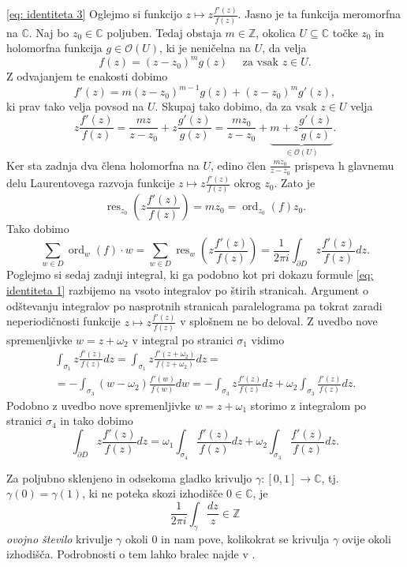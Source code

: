 \documentclass[mat1]{fmfdelo}
\numberwithin{equation}{section}
\newcommand{\Z}{\mathbb Z}
\newcommand{\C}{\mathbb C}
\newcommand{\res}[2]{\operatorname{res}_{#1}(#2)}
\newcommand{\ord}[2]{\operatorname{ord}_{#1}(#2)}
\newcommand{\hol}[1]{\mathcal{O}(#1)}
\theoremstyle{definition}
\begin{document}
\begin{dokaz}
    \eqref{eq: identiteta 3} Oglejmo si funkcijo $z \mapsto z \frac{f'(z)}{f(z)}$. Jasno je ta funkcija meromorfna na $\C$. Naj bo $z_0 \in \C$ poljuben. Tedaj obstaja $m \in \Z$, okolica $U \subseteq \C$ točke $z_0$ in holomorfna funkcija $g \in \hol{U}$, ki je neničelna na $U$, da velja
    \[
        f(z) = (z - z_0)^m g(z) \quad \text{ za vsak $z \in U$.}  
    \]
    Z odvajanjem te enakosti dobimo
    \[
        f'(z) = m(z - z_0)^{m - 1} g(z) + (z - z_0)^m g'(z),
    \]
    ki prav tako velja povsod na $U$. Skupaj tako dobimo, da za vsak $z \in U$ velja
    \[
        z\frac{f'(z)}{f(z)} = \frac{mz}{z-z_0} + z\frac{g'(z)}{g(z)} = \frac{mz_0}{z-z_0} + \underbrace{m + z\frac{g'(z)}{g(z)}}_{\in \hol{U}}.
    \]
    Ker sta zadnja dva člena holomorfna na $U$, edino člen $\frac{mz_0}{z-z_0}$ prispeva h glavnemu delu Laurentovega razvoja funkcije $z \mapsto z \frac{f'(z)}{f(z)}$ okrog $z_0$. Zato je 
    \[
        \operatorname{res}_{z_0} \left( z \frac{f'(z)}{f(z)} \right) = mz_0 = \ord{z_0}{f}z_0.  
    \]
    Tako dobimo 
    \[
        \sum_{w \in D} \ord{w}{f}\cdot w 
        = \sum_{w \in D} \operatorname{res}_{w} \left( z \frac{f'(z)}{f(z)} \right)
        = \frac{1}{2 \pi i} \int_{\partial D} z \frac{f'(z)}{f(z)}dz. 
    \] 
    Poglejmo si sedaj zadnji integral, ki ga podobno kot pri dokazu formule \eqref{eq: identiteta 1} razbijemo na vsoto integralov po štirih stranicah. Argument o odštevanju integralov po nasprotnih stranicah paralelograma pa tokrat zaradi neperiodičnosti funkcije $z \mapsto z \frac{f'(z)}{f(z)}$ v splošnem ne bo deloval. Z uvedbo nove spremenljivke $w = z + \omega_2$ v integral po stranici $\sigma_1$ vidimo
    \begin{multline*}
        \int_{\sigma_1} z \frac{f'(z)}{f(z)}dz = 
        \int_{\sigma_1} z \frac{f'(z + \omega_2)}{f(z + \omega_2)}dz = \\ = 
        - \int_{\sigma_3} (w - \omega_2) \frac{f'(w)}{f(w)}dw = 
        - \int_{\sigma_3} z \frac{f'(z)}{f(z)}dz + \omega_2 \int_{\sigma_3} \frac{f'(z)}{f(z)}dz.
    \end{multline*}
    Podobno z uvedbo nove spremenljivke $w = z + \omega_1$ storimo z integralom po stranici $\sigma_4$ in tako dobimo
    \[
        \int_{\partial D} z \frac{f'(z)}{f(z)}dz = \omega_1 \int_{\sigma_4} \frac{f'(z)}{f(z)}dz + \omega_2 \int_{\sigma_3} \frac{f'(z)}{f(z)}dz.
    \]

    Za poljubno sklenjeno in odsekoma gladko krivuljo $\gamma : [0,1] \to \C$, tj. $\gamma(0) = \gamma(1)$, ki ne poteka skozi izhodišče $0\in \C$, je
    \[
        \frac{1}{2 \pi i} \int_\gamma \frac{dz}{z} \in \Z
    \]
    \emph{ovojno število} krivulje $\gamma$ okoli $0$ in nam pove, kolikokrat se krivulja $\gamma$ ovije okoli izhodišča. Podrobnosti o tem lahko bralec najde v \cite[4.2.1.]{Ahlfors}.


\end{dokaz}
\end{document}
